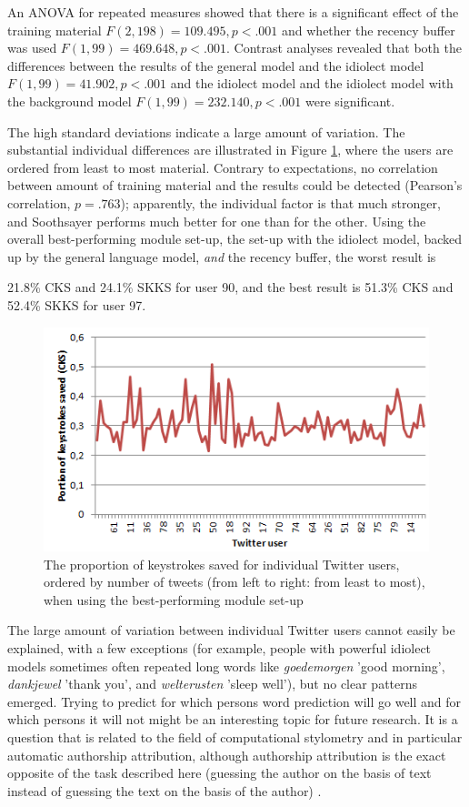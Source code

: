 \documentclass[12pt]{article}
\begin{document}
An ANOVA for repeated measures showed that there is a significant effect of the training material $F(2,198) = 109.495, p < .001$ and whether the recency buffer was used $F(1,99) = 469.648, p < .001$. Contrast analyses revealed that both the differences between the results of the general model and the idiolect model $F(1,99) = 41.902, p < .001$ and the idiolect model and the idiolect model with the background model $F(1,99) = 232.140, p < .001$ were significant.

The high standard deviations indicate a large amount of variation. The substantial individual differences are illustrated in Figure \ref{chaos}, where the users are ordered from least to most material. Contrary to expectations, no correlation between amount of training material and the results could be detected (Pearson's correlation, $p = .763$); apparently, the individual factor is that much stronger, and Soothsayer performs much better for one than for the other. Using the overall best-performing module set-up, the set-up with the idiolect model, backed up by the general language model, \emph{and} the recency buffer, the worst result is {21.8\% CKS and 24.1\% SKKS for user 90, and the best result is 51.3\% CKS and 52.4\% SKKS for user 97.

\begin{figure}[htb] \centering
\includegraphics[scale=1.0]{twitter_chaos}
\caption{The proportion of keystrokes saved for individual Twitter users, ordered by number of tweets (from left to right: from least to most), when using the best-performing module set-up}
\label{chaos}
\end{figure} 


The large amount of variation between individual Twitter users cannot easily be explained, with a few exceptions (for example, people with powerful idiolect models sometimes often repeated long words like \emph{goedemorgen} 'good morning', \emph{dankjewel} 'thank you', and \emph{welterusten} 'sleep well'), but no clear patterns emerged. Trying to predict for which persons word prediction will go well and for which persons it will not might be an interesting topic for future research. It is a question that is related to the field of computational stylometry and in particular automatic authorship attribution, although authorship attribution is the exact opposite of the task described here (guessing the author on the basis of text instead of guessing the text on the basis of the author) \cite{bagavandas+08}.

}
\end{document}
